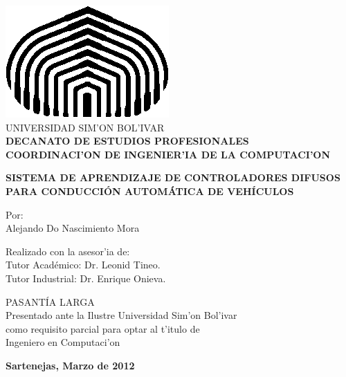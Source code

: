 \begin{titlepage}
\begin{center}



\includegraphics[scale=0.5,type=png,ext=.png,read=.png]{figures/cebolla} \\

\textsc {\large UNIVERSIDAD SIM'ON BOL'IVAR} \\
\textsc{\bfseries DECANATO DE ESTUDIOS PROFESIONALES\\
COORDINACI'ON DE INGENIER'IA DE LA COMPUTACI'ON}

\bigskip
\bigskip
\bigskip
\bigskip
\bigskip
\bigskip
\bigskip
\bigskip
\bigskip

\textsc{\bfseries SISTEMA DE APRENDIZAJE DE CONTROLADORES DIFUSOS PARA CONDUCCIÓN AUTOMÁTICA DE VEHÍCULOS}

\bigskip
\bigskip
\bigskip
\bigskip
\bigskip

\begin{minipage}{\textwidth}
\centering
Por: \\
Alejando Do Nascimiento Mora\\

\bigskip
\bigskip
\bigskip

Realizado con la asesor'ia de: \\
Tutor Académico: Dr. Leonid Tineo. \\
Tutor Industrial: Dr. Enrique Onieva.
\end{minipage}

\bigskip
\bigskip
\bigskip
\bigskip
\bigskip
\bigskip
\bigskip
\bigskip
\bigskip

{PASANT\'IA LARGA \\ Presentado ante la Ilustre Universidad Sim'on Bol'ivar \\
como requisito parcial para optar al t'itulo de \\ Ingeniero en Computaci'on} \\

\bigskip
\bigskip
\vfill

{\large \bfseries Sartenejas, Marzo de 2012}

\end{center}
\end{titlepage}
